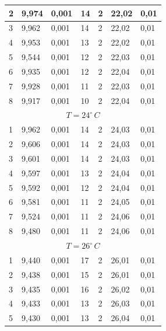 \documentclass[10pt,a4paper]{article}
\begin{document}
\begin{longtable}[h!]{|l|l|l|l|l|l|l|}
2 & 9,974  & 0,001 & 14 & 2                      & 22,02 & 0,01                      \\ \hline
3 & 9,962  & 0,001 & 14 & 2                      & 22,02 & 0,01                      \\ \hline
4 & 9,953  & 0,001 & 13 & 2                      & 22,02 & 0,01                      \\ \hline
5 & 9,544  & 0,001 & 12 & 2                      & 22,03 & 0,01                      \\ \hline
6 & 9,935  & 0,001 & 12 & 2                      & 22,04 & 0,01                      \\ \hline
7 & 9,928  & 0,001 & 11 & 2                      & 22,03 & 0,01                      \\ \hline
8 & 9,917  & 0,001 & 10 & 2                      & 22,04 & 0,01                      \\ \hline
\multicolumn{7}{|c|}{$T = 24^{\circ}\,C$}                                            \\ \hline
1 & 9,962  & 0,001 & 14 & 2 & 24,03 & 0,01 \\ \hline
2 & 9,606  & 0,001 & 14 & 2 & 24,03 & 0,01 \\ \hline
3 & 9,601  & 0,001 & 14 & 2 & 24,03 & 0,01 \\ \hline
4 & 9,597  & 0,001 & 13 & 2 & 24,04 & 0,01 \\ \hline
5 & 9,592  & 0,001 & 12 & 2 & 24,04 & 0,01 \\ \hline
6 & 9,581  & 0,001 & 11 & 2 & 24,05 & 0,01 \\ \hline
7 & 9,524  & 0,001 & 11 & 2 & 24,06 & 0,01 \\ \hline
8 & 9,480  & 0,001 & 11 & 2 & 24,06 & 0,01 \\ \hline
\multicolumn{7}{|c|}{$T = 26^{\circ}\,C$}                                            \\ \hline
1 & 9,440  & 0,001 & 17 & 2                      & 26,01 & 0,01                      \\ \hline
2 & 9,438  & 0,001 & 15 & 2                      & 26,01 & 0,01                      \\ \hline
3 & 9,435  & 0,001 & 16 & 2                      & 26,02 & 0,01                      \\ \hline
4 & 9,433  & 0,001 & 13 & 2                      & 26,03 & 0,01                      \\ \hline
5 & 9,430  & 0,001 & 13 & 2                      & 26,04 & 0,01                      \\ \hline

\end{longtable}
\end{document}

